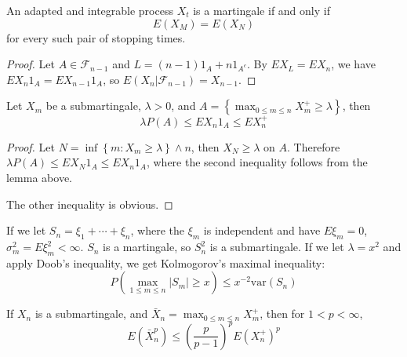 \begin{corollary}
    An adapted and integrable process $X_t$ is a martingale if and only if 
    \[E(X_M)=E(X_N)\] 
    for every such pair of stopping times.
\end{corollary}
\begin{proof}
    Let $A\in\mathcal{F}_{n-1}$ and $L=(n-1)1_A+n1_{A^c}$. By $EX_L=EX_n$, we have $EX_n1_A=EX_{n-1}1_A$,
    so $E(X_n|\mathcal{F}_{n-1})=X_{n-1}$.
\end{proof}


\begin{theorem}
Let $X_m$ be a submartingale, $\lambda>0$, and $A=\left\{ \max_{0\le m\le n}X_m^+  \ge\lambda\right\}$, then \[\lambda P(A)\le EX_n1_A\le EX_n^+\]
\end{theorem}
\begin{proof}
Let $N=\inf\left\{m:X_m\ge\lambda\right\}\wedge n$, then $X_N\ge\lambda$ on $A$. Therefore $\lambda P(A)\le EX_N1_A\le EX_n1_A$, where the second inequality follows from the lemma above.\par
The other inequality is obvious.
\end{proof}
\begin{example}
If we let $S_n=\xi_1+\cdots+\xi_n$, where the $\xi_m$ is independent and have $E\xi_m=0$, $\sigma_m^2=E\xi_m^2<\infty$. $S_n$ is a martingale, so $S_n^2$ is a submartingale. If we let $\lambda=x^2$ and apply Doob's inequality, we get Kolmogorov's maximal inequality: \[P(\max_{1\le m\le n}\left|S_m\right|\ge x)\le x^{-2}\text{var}(S_n)\]
\end{example}
\begin{theorem}
If $X_n$ is a submartingale, and $\bar{X}_n= \max_{0\le m\le n}X_m^+$, then for $1<p<\infty$, \[E(\bar{X}_n^p)\le (\frac{p}{p-1})^pE(X_n^+)^p\]
\end{theorem}

